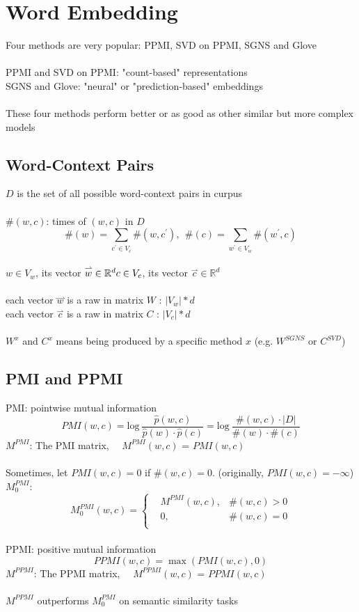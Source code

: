\documentclass[12pt,a4paper,twoside]{book}
\begin{document}
\section{Word Embedding}
Four methods are very popular: PPMI, SVD on PPMI, SGNS and Glove \\
\\
PPMI and SVD on PPMI: "count-based" representations\\
SGNS and Glove: "neural" or "prediction-based" embeddings\\
\\
These four methods perform better or as good as other similar but more complex models
\subsection{Word-Context Pairs}
$D$ is the set of all possible word-context pairs in curpus\\
\\
$\#(w,c)$: times of $(w,c)$ in $D$\\
$$\#(w)=\sum_{c^\prime\in V_c} \#(w,c^\prime),\ \   \#(c)=\sum_{w^\prime\in V_w} \#(w^\prime,c)$$
\\
$w\in V_w$, its vector $\overset{\rightharpoonup}{w}\in\mathbb{R}^d\\ c\in V_c$, its vector $\overset{\rightharpoonup}{c}\in\mathbb{R}^d$\\
\\
each vector $\overset{\rightharpoonup}{w}$ is a raw in matrix $W$ : $|V_w|*d$\\ each vector $\overset{\rightharpoonup}{c}$ is a raw in matrix $C$ : $|V_c|*d$\\
\\
$W^x$ and $C^x$ means being produced by a specific method $x$ (e.g. $W^{SGNS}$ or $C^{SVD}$)
\subsection{PMI and PPMI}
PMI: pointwise mutual information\\
$$PMI(w,c) = \mathrm{log}\ \frac{\widehat{p}(w,c)}{\widehat{p}(w)\cdot \widehat{p}(c)} = \mathrm{log}\ \frac{\#(w,c)\cdot |D|}{\#(w)\cdot \#(c)}$$
$M^{PMI}$: The PMI matrix, \ \  $M^{PMI}(w,c)$ = $PMI(w,c)$\\
\\
Sometimes, let $PMI(w,c) = 0$ if $\#(w,c)=0$. (originally, $PMI(w,c) = -\infty$) \\
$M_0^{PMI}$: $$ M_0^{PMI}(w,c) =\left\{
\begin{aligned}
& M^{PMI}(w,c), & \#(w,c)>0 \\
& 0, & \#(w,c)=0 \\
\end{aligned}
\right.
$$
\\
PPMI: positive mutual information\\
$$PPMI(w,c) = \max(PMI(w,c),0)$$
$M^{PPMI}$: The PPMI matrix, \ \ $M^{PPMI}(w,c)$ = $PPMI(w,c)$\\
\\
$M^{PPMI}$ outperforms $M^{PMI}_0$ on semantic similarity tasks
\end{document}
